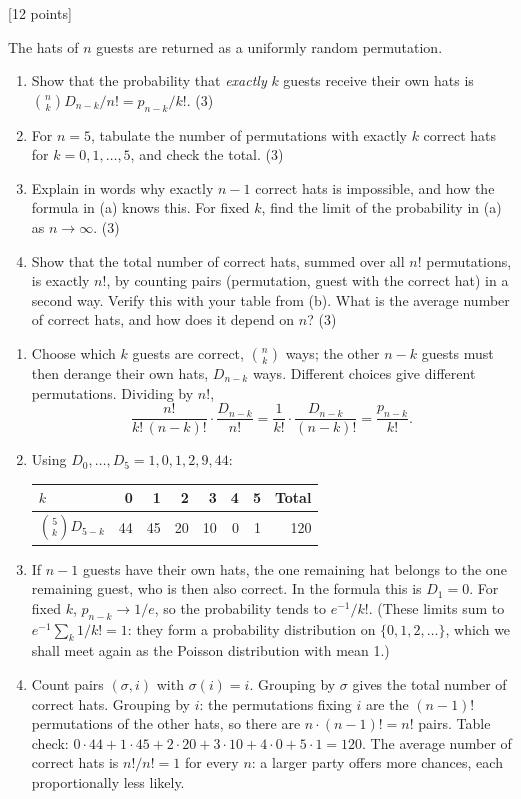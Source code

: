 \documentclass[11pt,letterpaper]{article}
\newcommand{\pts}[1]{\hfill\textcolor{muted}{\small[#1 points]}}
\newcommand{\partpts}[1]{\unskip\nobreak\hspace{.3em}\mbox{\textcolor{muted}{\small(#1)}}}
\newcounter{problem}
\newcommand{\problem}[2]{\par\addvspace{11pt}\Needspace{7\baselineskip}\stepcounter{problem}{\bfseries\color{indigo}\theproblem.\ #1}\pts{#2}\par\nobreak}
\begin{document}
\problem{How many guests get the right hat?}{12}
The hats of $n$ guests are returned as a uniformly random permutation.
\begin{enumerate}
 \item Show that the probability that \emph{exactly} $k$ guests receive
 their own hats is $\binom nk D_{n-k}/n!=p_{n-k}/k!$. \partpts{3}
 \item For $n=5$, tabulate the number of permutations with exactly $k$
 correct hats for $k=0,1,\ldots,5$, and check the total. \partpts{3}
 \item Explain in words why exactly $n-1$ correct hats is impossible, and
 how the formula in (a) knows this. For fixed $k$, find the limit of the
 probability in (a) as $n\to\infty$. \partpts{3}
 \item Show that the total number of correct hats, summed over all $n!$
 permutations, is exactly $n!$, by counting pairs (permutation, guest with
 the correct hat) in a second way. Verify this with your table from (b).
 What is the average number of correct hats, and how does it depend on
 $n$? \partpts{3}
\end{enumerate}
\begin{solution}
\begin{enumerate}
 \item Choose which $k$ guests are correct, $\binom nk$ ways; the other
 $n-k$ guests must then derange their own hats, $D_{n-k}$ ways. Different
 choices give different permutations. Dividing by $n!$,
 \[
 \frac{n!}{k!\,(n-k)!}\cdot\frac{D_{n-k}}{n!}
 =\frac1{k!}\cdot\frac{D_{n-k}}{(n-k)!}=\frac{p_{n-k}}{k!}.
 \]
 \item Using $D_0,\ldots,D_5=1,0,1,2,9,44$:
 \begin{center}\small
 \begin{tabular}{@{}l*{6}{r}r@{}}
 \toprule
 $k$ & 0 & 1 & 2 & 3 & 4 & 5 & Total\\
 \midrule
 $\binom5kD_{5-k}$ & 44 & 45 & 20 & 10 & 0 & 1 & 120\\
 \bottomrule
 \end{tabular}
 \end{center}
 \item If $n-1$ guests have their own hats, the one remaining hat belongs
 to the one remaining guest, who is then also correct. In the formula this
 is $D_1=0$. For fixed $k$, $p_{n-k}\to1/e$, so the probability tends to
 $e^{-1}/k!$. (These limits sum to $e^{-1}\sum_k1/k!=1$: they form a
 probability distribution on $\{0,1,2,\ldots\}$, which we shall meet again
 as the Poisson distribution with mean 1.)
 \item Count pairs $(\sigma,i)$ with $\sigma(i)=i$. Grouping by $\sigma$
 gives the total number of correct hats. Grouping by $i$: the permutations
 fixing $i$ are the $(n-1)!$ permutations of the other hats, so there are
 $n\cdot(n-1)!=n!$ pairs. Table check:
 $0\cdot44+1\cdot45+2\cdot20+3\cdot10+4\cdot0+5\cdot1=120$. The average
 number of correct hats is $n!/n!=1$ for every $n$: a larger party offers
 more chances, each proportionally less likely.
\end{enumerate}
\end{solution}
\end{document}
